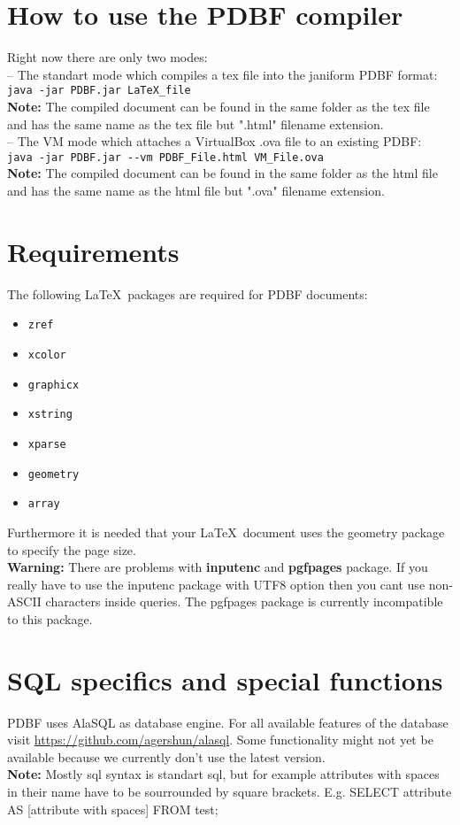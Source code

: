 \documentclass[11pt]{article}
\begin{document}
\section{How to use the PDBF compiler}
Right now there are only two modes: \\[4pt]
-- The standart mode which compiles a tex file into the janiform PDBF format:\\
\verb|java -jar PDBF.jar LaTeX_file| \\[2pt]
\textbf{Note:} The compiled document can be found in the same folder as the tex file and has the same name as the tex file but ".html" filename extension.\\[8pt]
-- The VM mode which attaches a VirtualBox .ova file to an existing PDBF:\\
\verb|java -jar PDBF.jar --vm PDBF_File.html VM_File.ova|\\[2pt]
\textbf{Note:} The compiled document can be found in the same folder as the html file and has the same name as the html file but ".ova" filename extension.

\section{Requirements}
The following \LaTeX~packages are required for PDBF documents:
\begin{itemize}
\item \verb|zref|
\item \verb|xcolor|
\item \verb|graphicx|
\item \verb|xstring|
\item \verb|xparse|
\item \verb|geometry|
\item \verb|array|
\end{itemize}
\noindent Furthermore it is needed that your \LaTeX~document uses the geometry package to specify the page size.\\

\noindent \textbf{Warning:} There are problems with \textbf{inputenc} and \textbf{pgfpages} package. If you really have to use the inputenc package with UTF8 option then you cant use non-ASCII characters inside queries. The pgfpages package is currently incompatible to this package. 

\section{SQL specifics and special functions}
PDBF uses AlaSQL as database engine. For all available features of the database visit \url{https://github.com/agershun/alasql}. Some functionality might not yet be available because we currently don't use the latest version.\\[4pt]
\textbf{Note:} Mostly sql syntax is standart sql, but for example attributes with spaces in their name have to be sourrounded by square brackets. E.g. SELECT attribute AS [attribute with spaces] FROM test;\\
\end{document}
